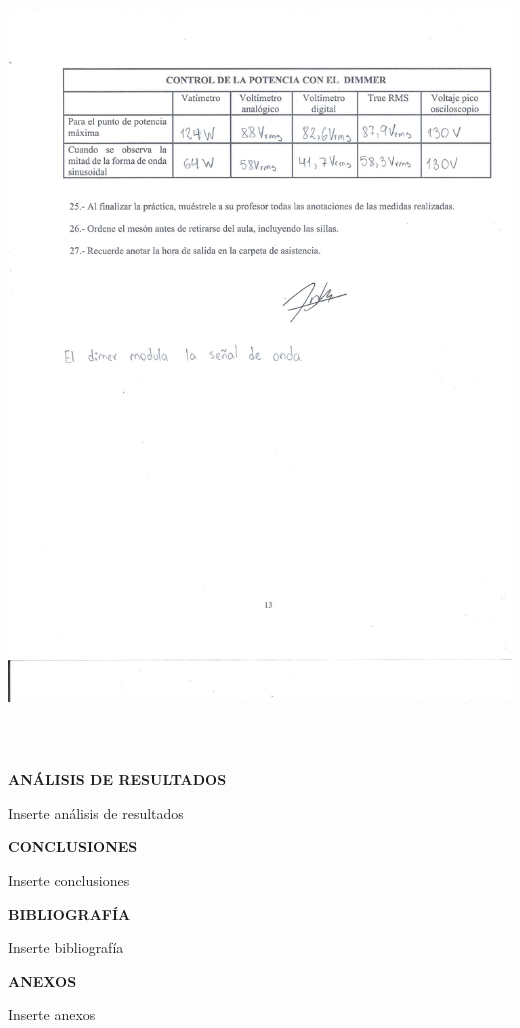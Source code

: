\documentclass[12pt]{article}
\begin{document}
	\includegraphics[width=16cm,height=21cm]{Img/Resultados_10}\\
	
	\newpage
	
	\begin{center}
		\textbf{\large ANÁLISIS DE RESULTADOS}\\
	\end{center}
	
	Inserte análisis de resultados
	
	\newpage
	
	\begin{center}
		\textbf{\large CONCLUSIONES}\\
	\end{center}
	
	Inserte conclusiones
	
	\newpage
	
	\begin{center}
		\textbf{\large BIBLIOGRAFÍA}\\
	\end{center}
	
	Inserte bibliografía
	
	\newpage
	
	\begin{center}
		\textbf{\large ANEXOS}\\
	\end{center}
	
	Inserte anexos
	
\end{document}
